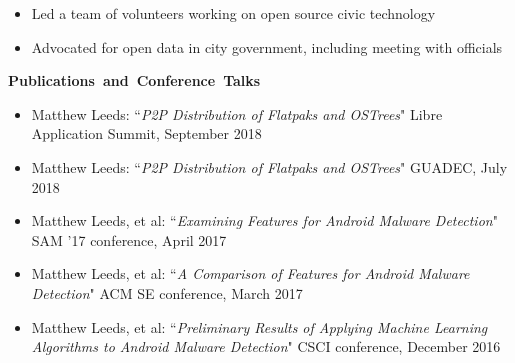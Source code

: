 \documentclass[11pt]{article}
\begin{document}
\begin{itemize}
  \item Led a team of volunteers working on open source civic technology
  \item Advocated for open data in city government, including meeting with officials
\end{itemize}

\vspace{0.8em}
\hbox{\large \textbf{Publications and Conference Talks}}

\begin{itemize}[itemindent=0em]
  \item Matthew Leeds: ``\textit{P2P Distribution of Flatpaks and OSTrees}"\newline
        Libre Application Summit, September 2018
  \item Matthew Leeds: ``\textit{P2P Distribution of Flatpaks and OSTrees}"\newline
        GUADEC, July 2018
  \item Matthew Leeds, et al: ``\textit{Examining Features for Android Malware Detection}"\newline
        SAM '17 conference, April 2017
  \item Matthew Leeds, et al: ``\textit{A Comparison of Features for Android Malware Detection}"\newline
        ACM SE conference, March 2017
  \item Matthew Leeds, et al: ``\textit{Preliminary Results of Applying Machine Learning Algorithms to Android Malware Detection}"\newline
        CSCI conference, December 2016
\end{itemize}
\end{document}
